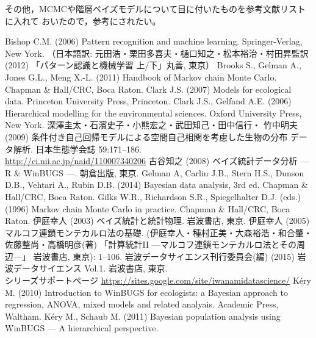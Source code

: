 \documentclass[11pt,uplatex]{jsarticle}
\begin{document}
その他，MCMCや階層ベイズモデルについて目に付いたものを参考文献リストに入れて
おいたので，参考にされたい。


\begin{thebibliography}{99}
 Bishop C.M. (2006) Pattern recognition and machine learning.
  Springer-Verlag, New York.
  （日本語訳: 元田浩・栗田多喜夫・樋口知之・松本裕治・村田昇監訳 (2012)
  「パターン認識と機械学習 上/下」丸善, 東京）
 Brooks S., Gelman A., Jones G.L., Meng X.-L. (2011)
Handbook of Markov chain Monte Carlo. Chapman \& Hall/CRC, Boca Raton. 
 Clark J.S. (2007) Models for ecological data.
  Princeton University Press, Princeton.
 Clark J.S., Gelfand A.E. (2006) Hierarchical modelling
  for the environmental sciences. Oxford University Press, New York.
 深澤圭太・石濱史子・小熊宏之・武田知己・田中信行・
  竹中明夫 (2009) 条件付き自己回帰モデルによる空間自己相関を考慮した生物の分布
  データ解析. 日本生態学会誌 59:171--186. \\
  \url{http://ci.nii.ac.jp/naid/110007340206}
 古谷知之 (2008) ベイズ統計データ分析 --- R \& WinBUGS ---.
  朝倉出版, 東京.
 Gelman A, Carlin J.B., Stern H.S., Dunson D.B., Vehtari A.,
  Rubin D.B. (2014) Bayesian data analysis, 3rd ed.
  Chapman \& Hall/CRC, Boca Raton.
 Gilks W.R., Richardson S.R., Spiegelhalter D.J. (eds.) (1996)
  Markov chain Monte Carlo in practice. Chapman \& Hall/CRC, Boca Raton.
 伊庭幸人 (2003) ベイズ統計と統計物理. 岩波書店, 東京.
 伊庭幸人 (2005) マルコフ連鎖モンテカルロ法の基礎. 
  (伊庭幸人・種村正美・大森裕浩・和合肇・佐藤整尚・高橋明彦(著)
  「計算統計II ---マルコフ連鎖モンテカルロ法とその周辺---」
  岩波書店, 東京): 1--106.
 岩波データサイエンス刊行委員会(編) (2015) 岩波データサイエンス Vol.1.
岩波書店, 東京. \\
シリーズサポートページ \url{https://sites.google.com/site/iwanamidatascience/}
 K\'ery M. (2010) Introduction to WinBUGS for ecologists:
  a Bayesian approach to regression, ANOVA, mixed models and related analyais.
  Academic Press, Waltham.
 K\'ery M., Schaub M. (2011) Bayesian population analysis using WinBUGS --- A hierarchical perspective.

\end{thebibliography}
\end{document}
